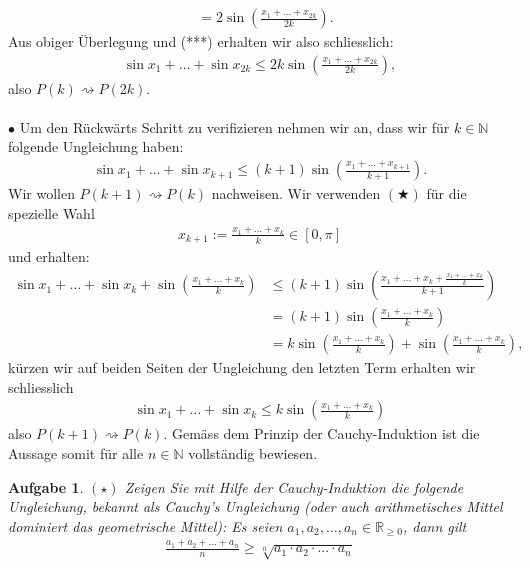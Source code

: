 \documentclass[a4paper, 20]{exam}
\newtheorem{ex}{Aufgabe}
\begin{document}
\begin{solution}
\begin{align*}
&= 2 \sin \left( \frac{x_1 + \dots + x_{2k}}{2k}\right).
\end{align*}
Aus obiger Überlegung und (***) erhalten wir also schliesslich:
\begin{align*}
\sin x_1 + \dots + \sin x_{2k} \leq 2k \sin \left( \frac{x_1 + \dots + x_{2k}}{2k}\right),
\end{align*}
also $P(k) \rightsquigarrow P(2k)$. 
\\
\\
$\bullet$ Um den Rückwärts Schritt zu verifizieren nehmen wir an, dass wir für $k \in \mathbb{N}$ folgende Ungleichung haben: 
\begin{align*}
\sin x_1 + \dots + \sin x_{k+1} \leq (k+1) \sin \left( \frac{x_1 + \dots + x_{k+1}}{k+1}\right). \tag{$\bigstar$}
\end{align*}
Wir wollen $P(k+1) \rightsquigarrow P(k)$ nachweisen. Wir verwenden $(\bigstar)$ für die spezielle Wahl 
\begin{align*}
x_{k+1}:= \frac{x_1 + \dots + x_k}{k} \in [0, \pi]
\end{align*}
und erhalten: 
\begin{align*}
\sin x_1 + \dots + \sin x_k + \sin \left( \frac{x_1 + \dots + x_k}{k}\right) &\leq (k+1) \sin \left( \frac{x_1 + \dots + x_k + \frac{x_1 + \dots + x_k}{k}}{k+1}\right) \\
& = (k+1) \sin \left( \frac{x_1 + \dots + x_k}{k}\right) \\
& = k \sin \left( \frac{x_1 + \dots + x_k}{k}\right) + \sin \left( \frac{x_1 + \dots + x_k}{k}\right),
\end{align*}
kürzen wir auf beiden Seiten der Ungleichung den letzten Term erhalten wir schliesslich 
\begin{align*}
\sin x_1 + \dots + \sin x_k \leq k \sin \left( \frac{x_1 + \dots + x_k}{k}\right)
\end{align*}
also $P(k+1) \rightsquigarrow P(k)$. Gemäss dem Prinzip der Cauchy-Induktion ist die Aussage somit für alle $n \in \mathbb{N}$ vollständig bewiesen. 
\end{solution}


\begin{ex}{$(\star)$} Zeigen Sie mit Hilfe der Cauchy-Induktion die folgende Ungleichung, bekannt als Cauchy's Ungleichung (oder auch arithmetisches Mittel dominiert das geometrische Mittel): Es seien $a_1, a_2, \dots , a_n \in \mathbb{R}_{ \geq 0}$, dann gilt
\begin{align*}
\frac{a_1 + a_2 + \dots + a_n}{n} \geq \sqrt[n]{a_1 \cdot a_2 \cdot ... \cdot a_n}
\end{align*}
\end{ex}
\end{document}
